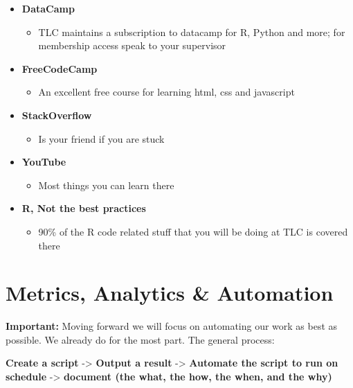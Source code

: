 \documentclass[
]{book}
\providecommand{\tightlist}{%
  \setlength{\itemsep}{0pt}\setlength{\parskip}{0pt}}
\begin{document}
\begin{itemize}
\item
  \textbf{DataCamp}

  \begin{itemize}
  \tightlist
  \item
    TLC maintains a subscription to datacamp for R, Python and more; for membership access speak to your supervisor
  \end{itemize}
\item
  \textbf{FreeCodeCamp}

  \begin{itemize}
  \tightlist
  \item
    An excellent free course for learning html, css and javascript
  \end{itemize}
\item
  \textbf{StackOverflow}

  \begin{itemize}
  \tightlist
  \item
    Is your friend if you are stuck
  \end{itemize}
\item
  \textbf{YouTube}

  \begin{itemize}
  \tightlist
  \item
    Most things you can learn there
  \end{itemize}
\item
  \textbf{R, Not the best practices}

  \begin{itemize}
  \tightlist
  \item
    90\% of the R code related stuff that you will be doing at TLC is covered there
  \end{itemize}
\end{itemize}

\hypertarget{metrics-analytics-automation}{%
\section{Metrics, Analytics \& Automation}\label{metrics-analytics-automation}}

\textbf{Important:} Moving forward we will focus on automating our work as best as possible. We already do for the most part. The general process:

\textbf{Create a script} -\textgreater{} \textbf{Output a result} -\textgreater{} \textbf{Automate the script to run on schedule} -\textgreater{} \textbf{document (the what, the how, the when, and the why)}
\end{document}
